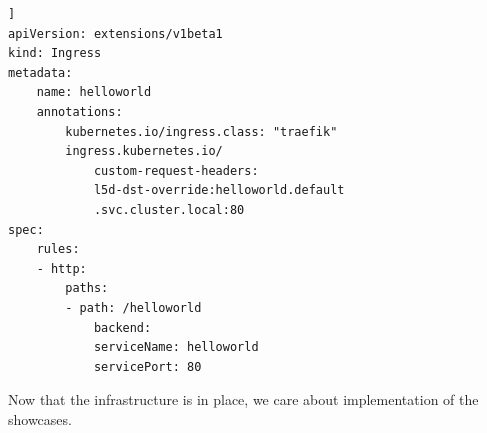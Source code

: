 \begin{lstlisting}[caption={YAML configuration of \lstinline|helloworld|-ingress controller.}, label={lst:ingress-hello}]]
apiVersion: extensions/v1beta1
kind: Ingress
metadata:
	name: helloworld
	annotations:
		kubernetes.io/ingress.class: "traefik"
		ingress.kubernetes.io/
			custom-request-headers: 
			l5d-dst-override:helloworld.default
			.svc.cluster.local:80
spec:
	rules:
	- http:
		paths:
		- path: /helloworld
			backend:
			serviceName: helloworld
			servicePort: 80
\end{lstlisting}

Now that the infrastructure is in place, we care about implementation of the showcases.


